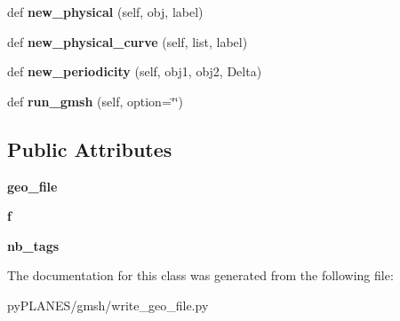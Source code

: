 \begin{DoxyCompactItemize}
def {\bfseries new\+\_\+physical} (self, obj, label)
\item 
\mbox{\label{classpy_p_l_a_n_e_s_1_1gmsh_1_1write__geo__file_1_1_gmsh_aa56ef3e141e889154b21bd8e6c17196a}} 
def {\bfseries new\+\_\+physical\+\_\+curve} (self, list, label)
\item 
\mbox{\label{classpy_p_l_a_n_e_s_1_1gmsh_1_1write__geo__file_1_1_gmsh_ac551f383ba4c2738863db01968d3c3f4}} 
def {\bfseries new\+\_\+periodicity} (self, obj1, obj2, Delta)
\item 
\mbox{\label{classpy_p_l_a_n_e_s_1_1gmsh_1_1write__geo__file_1_1_gmsh_a570d941b084f57370feb48a7d453cdf6}} 
def {\bfseries run\+\_\+gmsh} (self, option=\char`\"{}\char`\"{})
\end{DoxyCompactItemize}
\subsection*{Public Attributes}
\begin{DoxyCompactItemize}
\item 
\mbox{\label{classpy_p_l_a_n_e_s_1_1gmsh_1_1write__geo__file_1_1_gmsh_a5307f58569670ccdcd38fc31e2e20f17}} 
{\bfseries geo\+\_\+file}
\item 
\mbox{\label{classpy_p_l_a_n_e_s_1_1gmsh_1_1write__geo__file_1_1_gmsh_a689a51624ed9ea72c48c712d84ca061e}} 
{\bfseries f}
\item 
\mbox{\label{classpy_p_l_a_n_e_s_1_1gmsh_1_1write__geo__file_1_1_gmsh_a306aaab890611d1b8ea5e4feee56110a}} 
{\bfseries nb\+\_\+tags}
\end{DoxyCompactItemize}


The documentation for this class was generated from the following file\+:\begin{DoxyCompactItemize}
\item 
py\+P\+L\+A\+N\+E\+S/gmsh/write\+\_\+geo\+\_\+file.\+py\end{DoxyCompactItemize}
